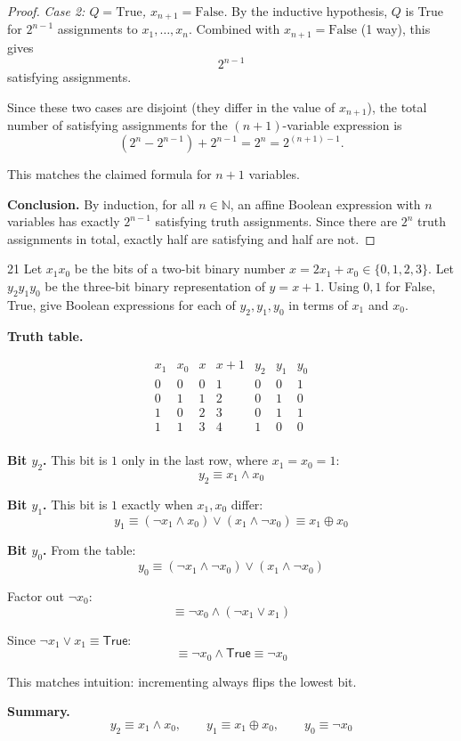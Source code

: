\begin{solbox}[long]
\begin{proof}
\smallskip
\noindent\textit{Case 2: $Q=\text{True}$, $x_{n+1}=\text{False}$.} By the inductive hypothesis, $Q$ is True for $2^{n-1}$ assignments to $x_1,\dots,x_n$. Combined with $x_{n+1}=\text{False}$ (1 way), this gives
\[
2^{n-1}
\]
satisfying assignments.

\smallskip
Since these two cases are disjoint (they differ in the value of $x_{n+1}$), the total number of satisfying assignments for the $(n+1)$-variable expression is
\[
(2^n - 2^{n-1}) + 2^{n-1} = 2^n = 2^{(n+1)-1}.
\]

This matches the claimed formula for $n+1$ variables.

\bigskip
\noindent\textbf{Conclusion.} By induction, for all $n\in\mathbb{N}$, an affine Boolean expression with $n$ variables has exactly $2^{n-1}$ satisfying truth assignments. Since there are $2^n$ truth assignments in total, exactly half are satisfying and half are not. \qedhere
\end{proof}
\end{solbox}

\begin{exercise}{21}
    Let $x_1x_0$ be the bits of a two-bit binary number $x=2x_1+x_0\in\{0,1,2,3\}$.
    Let $y_2y_1y_0$ be the three-bit binary representation of $y=x+1$. Using $0,1$
    for False, True, give Boolean expressions for each of $y_2,y_1,y_0$ in terms
    of $x_1$ and $x_0$.
\end{exercise}
\begin{solbox}

\begin{solution}
\textbf{Truth table.}

\[
\begin{array}{cc|c|c|ccc}
x_1 & x_0 & x & x+1 & y_2 & y_1 & y_0 \\
\hline
0 & 0 & 0 & 1 & 0 & 0 & 1 \\
0 & 1 & 1 & 2 & 0 & 1 & 0 \\
1 & 0 & 2 & 3 & 0 & 1 & 1 \\
1 & 1 & 3 & 4 & 1 & 0 & 0 \\
\end{array}
\]

\bigskip
\textbf{Bit $y_2$.} This bit is $1$ only in the last row, where $x_1=x_0=1$:
\[
y_2 \equiv x_1\wedge x_0
\]

\bigskip
\textbf{Bit $y_1$.} This bit is $1$ exactly when $x_1,x_0$ differ:
\[
y_1 \equiv (\neg x_1\wedge x_0)\vee(x_1\wedge\neg x_0) \equiv x_1\oplus x_0
\]

\bigskip
\textbf{Bit $y_0$.} From the table:
\[
y_0 \equiv (\neg x_1\wedge\neg x_0)\vee(x_1\wedge\neg x_0)
\]

Factor out $\neg x_0$:
\[
\equiv \neg x_0 \wedge(\neg x_1\vee x_1)
\]

Since $\neg x_1\vee x_1\equiv\mathsf{True}$:
\[
\equiv \neg x_0\wedge\mathsf{True} \equiv \neg x_0
\]

This matches intuition: incrementing always flips the lowest bit.

\bigskip
\textbf{Summary.}
\[
y_2 \equiv x_1\wedge x_0, \qquad y_1\equiv x_1\oplus x_0, \qquad y_0\equiv \neg x_0
\]
\end{solution}
\end{solbox}

